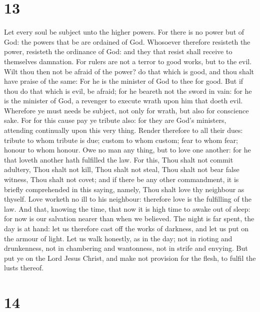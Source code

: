 \hypertarget{section-12}{%
\section{13}\label{section-12}}

 Let every soul be subject unto the higher powers. For there
is no power but of God: the powers that be are ordained of God.
 Whosoever therefore resisteth the power, resisteth the
ordinance of God: and they that resist shall receive to themselves
damnation.  For rulers are not a terror to good works, but
to the evil. Wilt thou then not be afraid of the power? do that which is
good, and thou shalt have praise of the same:  For he is the
minister of God to thee for good. But if thou do that which is evil, be
afraid; for he beareth not the sword in vain: for he is the minister of
God, a revenger to execute wrath upon him that doeth evil. 
Wherefore ye must needs be subject, not only for wrath, but also for
conscience sake.  For for this cause pay ye tribute also:
for they are God's ministers, attending continually upon this very
thing.  Render therefore to all their dues: tribute to whom
tribute is due; custom to whom custom; fear to whom fear; honour to whom
honour.  Owe no man any thing, but to love one another: for
he that loveth another hath fulfilled the law.  For this,
Thou shalt not commit adultery, Thou shalt not kill, Thou shalt not
steal, Thou shalt not bear false witness, Thou shalt not covet; and if
there be any other commandment, it is briefly comprehended in this
saying, namely, Thou shalt love thy neighbour as thyself. 
Love worketh no ill to his neighbour: therefore love is the fulfilling
of the law.  And that, knowing the time, that now it is
high time to awake out of sleep: for now is our salvation nearer than
when we believed.  The night is far spent, the day is at
hand: let us therefore cast off the works of darkness, and let us put on
the armour of light.  Let us walk honestly, as in the day;
not in rioting and drunkenness, not in chambering and wantonness, not in
strife and envying.  But put ye on the Lord Jesus Christ,
and make not provision for the flesh, to fulfil the lusts thereof.

\hypertarget{section-13}{%
\section{14}\label{section-13}}

